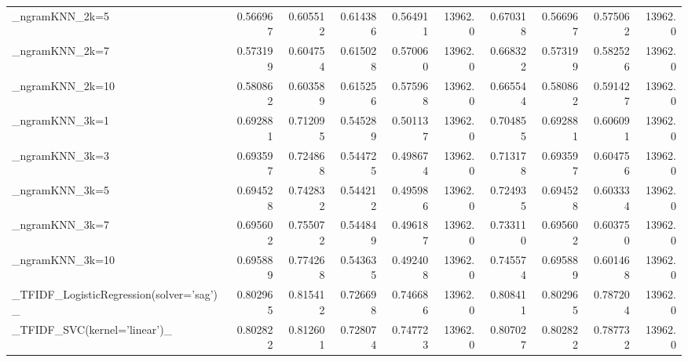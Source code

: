 \begin{tabular}{lrrrrrrrrr}
\_ngramKNN\_2k=5                                     &  0.566967 &         0.605512 &      0.614386 &        0.564911 &        13962.0 &            0.670318 &         0.566967 &           0.575062 &           13962.0 \\
\_ngramKNN\_2k=7                                     &  0.573199 &         0.604754 &      0.615028 &        0.570060 &        13962.0 &            0.668322 &         0.573199 &           0.582526 &           13962.0 \\
\_ngramKNN\_2k=10                                    &  0.580862 &         0.603589 &      0.615256 &        0.575968 &        13962.0 &            0.665544 &         0.580862 &           0.591427 &           13962.0 \\
\_ngramKNN\_3k=1                                     &  0.692881 &         0.712095 &      0.545289 &        0.501137 &        13962.0 &            0.704855 &         0.692881 &           0.606091 &           13962.0 \\
\_ngramKNN\_3k=3                                     &  0.693597 &         0.724868 &      0.544725 &        0.498674 &        13962.0 &            0.713178 &         0.693597 &           0.604756 &           13962.0 \\
\_ngramKNN\_3k=5                                     &  0.694528 &         0.742832 &      0.544212 &        0.495986 &        13962.0 &            0.724935 &         0.694528 &           0.603334 &           13962.0 \\
\_ngramKNN\_3k=7                                     &  0.695602 &         0.755072 &      0.544849 &        0.496187 &        13962.0 &            0.733110 &         0.695602 &           0.603750 &           13962.0 \\
\_ngramKNN\_3k=10                                    &  0.695889 &         0.774268 &      0.543635 &        0.492408 &        13962.0 &            0.745574 &         0.695889 &           0.601468 &           13962.0 \\
\_TFIDF\_LogisticRegression(solver='sag')\_           &  0.802965 &         0.815412 &      0.726698 &        0.746686 &        13962.0 &            0.808411 &         0.802965 &           0.787204 &           13962.0 \\
\_TFIDF\_SVC(kernel='linear')\_                       &  0.802822 &         0.812601 &      0.728074 &        0.747723 &        13962.0 &            0.807027 &         0.802822 &           0.787732 &           13962.0 \\

\end{tabular}
